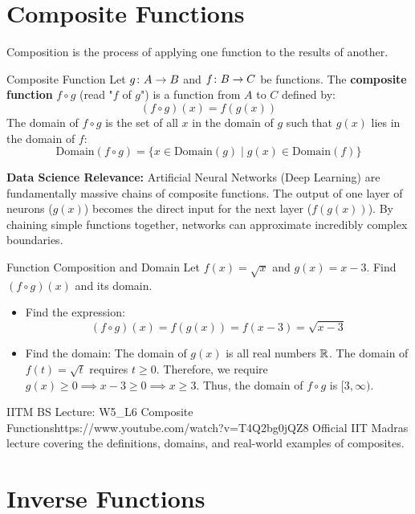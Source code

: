 \section{Composite Functions}

Composition is the process of applying one function to the results of another.

\begin{definitionbox}{Composite Function}
Let $g \colon A \to B$ and $f \colon B \to C$ be functions. The \textbf{composite function} $f \circ g$ (read "$f$ of $g$") is a function from $A$ to $C$ defined by:
$$(f \circ g)(x) = f(g(x))$$
The domain of $f \circ g$ is the set of all $x$ in the domain of $g$ such that $g(x)$ lies in the domain of $f$:
$$\text{Domain}(f \circ g) = \{ x \in \text{Domain}(g) \mid g(x) \in \text{Domain}(f) \}$$
\end{definitionbox}

\textbf{Data Science Relevance:} Artificial Neural Networks (Deep Learning) are fundamentally massive chains of composite functions. The output of one layer of neurons ($g(x)$) becomes the direct input for the next layer ($f(g(x))$). By chaining simple functions together, networks can approximate incredibly complex boundaries.

\begin{examplebox}{Function Composition and Domain}
Let $f(x) = \sqrt{x}$ and $g(x) = x - 3$. Find $(f \circ g)(x)$ and its domain.
\begin{itemize}
    \item Find the expression:
    $$(f \circ g)(x) = f(g(x)) = f(x - 3) = \sqrt{x - 3}$$
    \item Find the domain:
    The domain of $g(x)$ is all real numbers $\mathbb{R}$.
    The domain of $f(t) = \sqrt{t}$ requires $t \ge 0$.
    Therefore, we require $g(x) \ge 0 \implies x - 3 \ge 0 \implies x \ge 3$.
    Thus, the domain of $f \circ g$ is $[3, \infty)$.
\end{itemize}
\end{examplebox}

\begin{videocard}{IITM BS Lecture: W5\_L6 Composite Functions}{https://www.youtube.com/watch?v=T4Q2bg0jQZ8}
Official IIT Madras lecture covering the definitions, domains, and real-world examples of composites.
\end{videocard}

\section{Inverse Functions}

